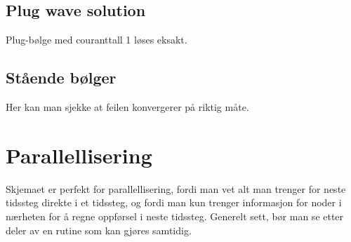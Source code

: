 \documentclass[a4paper, 10pt]{article}
\begin{document}
\subsection{Plug wave solution}
Plug-bølge med couranttall 1 løses eksakt. 

\subsection{Stående bølger}
Her kan man sjekke at feilen konvergerer på riktig måte.


\section{Parallellisering}
Skjemaet er perfekt for parallellisering, fordi man vet alt man trenger for neste tidssteg direkte i et tidssteg, og fordi man kun trenger informasjon for noder i nærheten for å regne oppførsel i neste tidssteg. 
Generelt sett, bør man se etter deler av en rutine som kan gjøres samtidig. 
\end{document}
